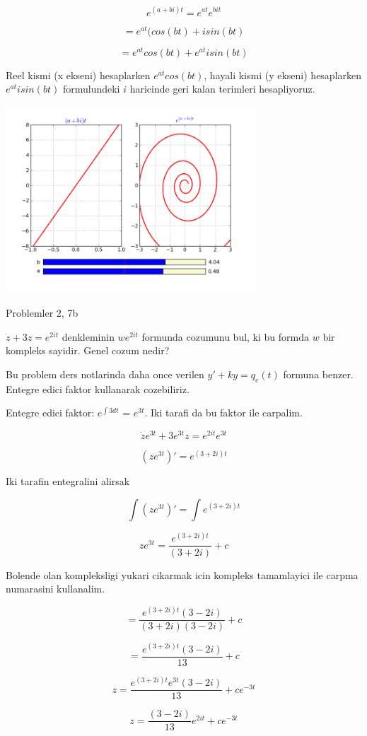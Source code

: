 \documentclass[12pt,fleqn]{article}
\begin{document}
\[ e^{(a+bi)t} = e^{at} e^{bit}\]

\[ = e^{at} (cos(bt) + isin(bt) \]

\[ = e^{at}cos(bt) + e^{at} isin(bt) \]

Reel kismi (x ekseni) hesaplarken $e^{at}cos(bt)$, hayali kismi (y ekseni)
hesaplarken $e^{at} isin(bt)$ formulundeki $i$ haricinde geri kalan terimleri
hesapliyoruz.



\includegraphics[height=7cm]{compexp.png}

Problemler 2, 7b

$\dot{z} + 3z = e^{2it}$ denkleminin $we^{2it}$ formunda cozumunu bul, ki
bu formda $w$ bir kompleks sayidir. Genel cozum nedir? 

Bu problem ders notlarinda daha once verilen $y' + ky = q_e(t)$ formuna
benzer. Entegre edici faktor kullanarak cozebiliriz. 

Entegre edici faktor: $e^{\int 3 dt}$ = $e^{3t}$. Iki tarafi da bu faktor
ile carpalim. 

\[ \dot{z}e^{3t} + 3e^{3t}z = e^{2it}e^{3t} \]

\[ (ze^{3t})' = e^{(3+2i)t} \]

Iki tarafin entegralini alirsak

\[ \int (ze^{3t})' = \int e^{(3+2i)t} \]

\[ ze^{3t} =  \frac {e^{(3+2i)t}}{(3+2i)} + c\]

Bolende olan kompleksligi yukari cikarmak icin kompleks tamamlayici ile
carpma numarasini kullanalim. 

\[ =  \frac {e^{(3+2i)t}(3-2i)}{(3+2i)(3-2i)} + c\]

\[ =  \frac {e^{(3+2i)t}(3-2i)}{13} + c\]

\[ z =  \frac {e^{(3+2i)t}e^{3t}(3-2i)}{13} + c e^{-3t}\]

\[ z = \frac {(3-2i)}{13} e^{2it} + c e^{-3t}\]
\end{document}
